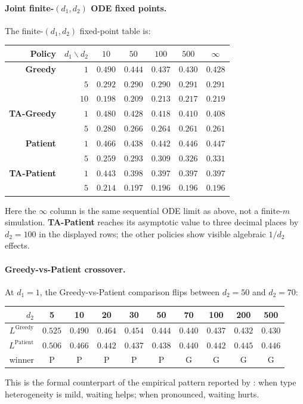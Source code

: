 \documentclass{article}
\theoremstyle{plain}
\theoremstyle{definition}
\begin{document}
\paragraph{Joint finite-$(d_1,d_2)$ ODE fixed points.}
The finite-$(d_1,d_2)$ fixed-point table is:
\begin{center}
\begin{tabular}{r|r|ccccc}
Policy & $d_1\backslash d_2$ & $10$ & $50$ & $100$ & $500$ & $\infty$\\\hline
\textbf{Greedy} & $1$  & $0.490$ & $0.444$ & $0.437$ & $0.430$ & $0.428$\\
                & $5$  & $0.292$ & $0.290$ & $0.290$ & $0.291$ & $0.291$\\
                & $10$ & $0.198$ & $0.209$ & $0.213$ & $0.217$ & $0.219$\\\hline
\textbf{TA-Greedy} & $1$  & $0.480$ & $0.428$ & $0.418$ & $0.410$ & $0.408$\\
                   & $5$  & $0.280$ & $0.266$ & $0.264$ & $0.261$ & $0.261$\\\hline
\textbf{Patient} & $1$  & $0.466$ & $0.438$ & $0.442$ & $0.446$ & $0.447$\\
                 & $5$  & $0.259$ & $0.293$ & $0.309$ & $0.326$ & $0.331$\\\hline
\textbf{TA-Patient} & $1$  & $0.443$ & $0.398$ & $0.397$ & $0.397$ & $0.397$\\
                    & $5$  & $0.214$ & $0.197$ & $0.196$ & $0.196$ & $0.196$
\end{tabular}
\end{center}
Here the $\infty$ column is the same sequential ODE limit as above, not a finite-$m$ simulation. \textbf{TA-Patient} reaches its asymptotic value to three decimal places by $d_2=100$ in the displayed rows; the other policies show visible algebraic $1/d_2$ effects.

\paragraph{Greedy-vs-Patient crossover.}
At $d_1=1$, the Greedy-vs-Patient comparison flips between $d_2=50$ and $d_2=70$:
\begin{center}
\begin{tabular}{r|ccccccccc}
$d_2$               & 5 & 10 & 20 & 30 & 50 & 70 & 100 & 200 & 500\\\hline
$L^{\text{Greedy}}$  & $0.525$ & $0.490$ & $0.464$ & $0.454$ & $0.444$ & $0.440$ & $0.437$ & $0.432$ & $0.430$\\
$L^{\text{Patient}}$ & $0.506$ & $0.466$ & $0.442$ & $0.437$ & $0.438$ & $0.440$ & $0.442$ & $0.445$ & $0.446$\\
winner               & P & P & P & P & P & G & G & G & G
\end{tabular}
\end{center}
This is the formal counterpart of the empirical pattern reported by \cite{Liu2019TheEO}: when type heterogeneity is mild, waiting helps; when pronounced, waiting hurts.
\end{document}
